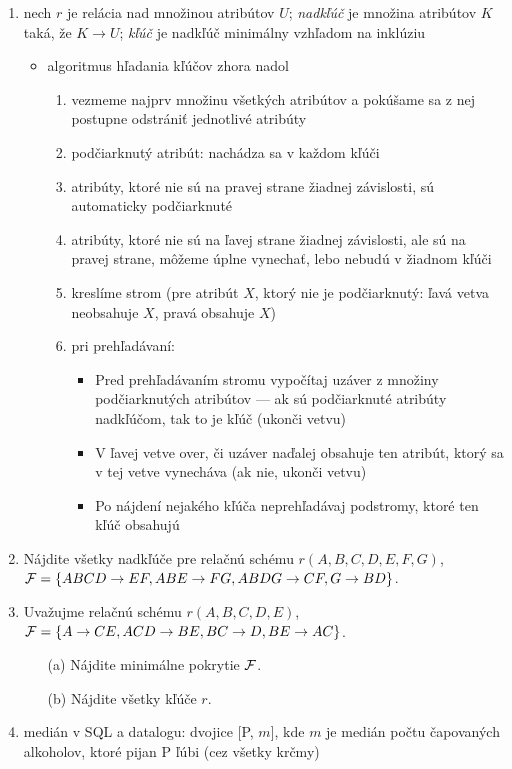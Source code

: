 \documentclass[10pt, a4paper]{article}
\begin{document}
\begin{enumerate}
\item nech $r$ je relácia nad množinou atribútov $U$; \emph{nadkľúč} je množina atribútov $K$ taká, že $K\to U$; \emph{kľúč} je nadkľúč minimálny vzhľadom na inklúziu
\begin{itemize}
    \item algoritmus hľadania kľúčov zhora nadol
        \begin{enumerate}
            \item vezmeme najprv množinu všetkých atribútov a pokúšame sa z nej postupne odstrániť jednotlivé atribúty
            \item podčiarknutý atribút: nachádza sa v každom kľúči
            \item atribúty, ktoré nie sú na pravej strane žiadnej závislosti, sú automaticky podčiarknuté
            \item atribúty, ktoré nie sú na ľavej strane žiadnej závislosti, ale sú na pravej strane, môžeme úplne vynechať, lebo nebudú v žiadnom kľúči
            \item kreslíme strom (pre atribút $X$, ktorý nie je podčiarknutý: ľavá vetva neobsahuje $X$, pravá obsahuje $X$)
            \item pri prehľadávaní:
                \begin{itemize}
                    \item Pred prehľadávaním stromu vypočítaj uzáver z množiny podčiarknutých atribútov --- ak sú podčiarknuté atribúty nadkľúčom, tak to je kľúč (ukonči vetvu)
                    \item V ľavej vetve over, či uzáver naďalej obsahuje ten atribút, ktorý sa v tej vetve vynecháva (ak nie, ukonči vetvu)
                    \item Po nájdení nejakého kľúča neprehľadávaj podstromy, ktoré ten kľúč obsahujú
                \end{itemize}
        \end{enumerate}
\end{itemize}

\item Nájdite všetky nadkľúče pre relačnú schému $r(A, B, C, D, E, F, G)$,\\
${\cal F}=\{ABCD\to EF, ABE\to FG, ABDG\to CF, G\to BD\}$.

\item Uvažujme relačnú schému $r(A, B, C, D, E)$,\\
${\cal F}=\{A\to CE, ACD\to BE, BC\to D, BE\to AC\}$.
\begin{itemize}
    \item[(a)] Nájdite minimálne pokrytie ${\cal F}$.
    \item[(b)] Nájdite všetky kľúče $r$.
\end{itemize}

\item medián v SQL a datalogu: dvojice [P, $m$], kde $m$ je medián počtu čapovaných alkoholov, ktoré pijan P ľúbi (cez všetky krčmy)
\end{enumerate}
\end{document}
